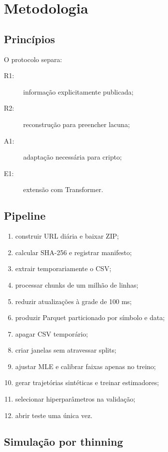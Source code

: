 \documentclass[12pt,a4paper,openany]{report}
\begin{document}
\chapter{Metodologia}

\section{Princípios}

O protocolo separa:
\begin{description}
  \item[R1:] informação explicitamente publicada;
  \item[R2:] reconstrução para preencher lacuna;
  \item[A1:] adaptação necessária para cripto;
  \item[E1:] extensão com Transformer.
\end{description}

\section{Pipeline}

\begin{enumerate}
  \item construir URL diária e baixar ZIP;
  \item calcular SHA-256 e registrar manifesto;
  \item extrair temporariamente o CSV;
  \item processar chunks de um milhão de linhas;
  \item reduzir atualizações à grade de 100 ms;
  \item produzir Parquet particionado por símbolo e data;
  \item apagar CSV temporário;
  \item criar janelas sem atravessar splits;
  \item ajustar MLE e calibrar faixas apenas no treino;
  \item gerar trajetórias sintéticas e treinar estimadores;
  \item selecionar hiperparâmetros na validação;
  \item abrir teste uma única vez.
\end{enumerate}

\section{Simulação por thinning}
\end{document}

